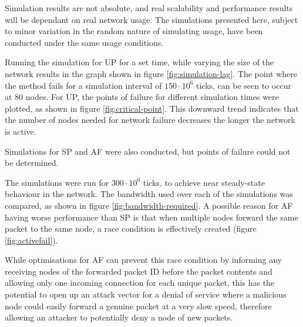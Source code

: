 			Simulation results are not absolute, and real scalability and performance results will be dependant on real network usage. The simulations presented here, subject to minor variation in the random nature of simulating usage, have been conducted under the same usage conditions.
			
			Running the simulation for UP for a set time, while varying the size of the network results in the graph shown in figure \ref{fig:simulation-lag}. The point where the method fails for a simulation interval of $150\cdot10^6$ ticks, can be seen to occur at 80 nodes. For UP, the points of failure for different simulation times were plotted, as shown in figure \ref{fig:critical-point}. This downward trend indicates that the number of nodes needed for network failure decreases the longer the network is active.
			
			Simulations for SP and AF were also conducted, but points of failure could not be determined.
			
			The simulations were run for $300\cdot10^6$ ticks, to achieve near steady-state behaviour in the network. The bandwidth used over each of the simulations was compared, as shown in figure \ref{fig:bandwidth-required}. A possible reason for AF having worse performance than SP is that when multiple nodes forward the same packet to the same node, a race condition is effectively created (figure \ref{fig:activefail}).
			
			While optimisations for AF can prevent this race condition by informing any receiving nodes of the forwarded packet ID before the packet contents and allowing only one incoming connection for each unique packet, this has the potential to open up an attack vector for a denial of service where a malicious node could easily forward a genuine packet at a very slow speed, therefore allowing an attacker to potentially deny a node of new packets.
			
